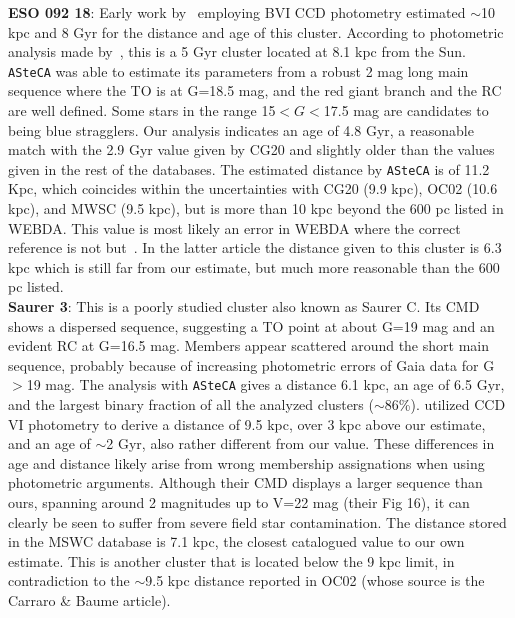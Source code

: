 \documentclass{aa}
\begin{document}
\begin{appendix}
  \noindent \textbf{ESO 092 18}: Early work by~\cite{Kubiak_1991} employing BVI CCD
  photometry estimated $\sim$10 kpc and 8 Gyr for the distance and age of this
  cluster.
  According to photometric analysis made by~\cite{Carraro1995}, this is a 5 Gyr
  cluster located at 8.1 kpc from the Sun.
  \texttt{ASteCA} was able to estimate its parameters from a robust 2 mag long
  main sequence where the TO is at G=18.5 mag, and the red giant branch and the
  RC are well defined. Some stars in the range 15$<G<$17.5 mag are candidates to
  being blue stragglers.
  Our analysis indicates an age of 4.8 Gyr, a reasonable match with the 2.9 Gyr
  value given by CG20 and slightly older than the values given in the rest of
  the databases. The estimated distance by \texttt{ASteCA} is of 11.2 Kpc, which
  coincides within the uncertainties with CG20 (9.9 kpc), OC02 (10.6 kpc), and
  MWSC (9.5 kpc), but is more than 10 kpc beyond the 600 pc listed in WEBDA.
  This value is most likely an error in WEBDA where the correct reference is
  not \cite{Phelps_1994_develop} but~\cite{Janes_1994}. In the latter article
  the distance given to this cluster is 6.3 kpc which is still far from our
  estimate, but much more reasonable than the 600 pc listed.\\

  \noindent \textbf{Saurer 3}: This is a poorly studied cluster also known as Saurer C.
  Its CMD shows a dispersed sequence, suggesting a TO point at about G=19 mag
  and an evident RC at G=16.5 mag. Members appear scattered around the short
  main sequence, probably because of increasing photometric errors of Gaia data
  for G$>$19 mag.
  The analysis with \texttt{ASteCA} gives a distance 6.1 kpc, an age of 6.5
  Gyr, and the largest binary fraction of all the analyzed clusters 
  ($\sim$86\%).
  \cite{Carraro_2003} utilized CCD VI photometry to derive a distance of 9.5
  kpc, over 3 kpc above our estimate, and an age of $\sim$2 Gyr, also rather
  different from our value. These differences in age and distance likely
  arise from wrong membership assignations when using photometric
  arguments. Although their CMD displays a larger sequence than
  ours, spanning around 2 magnitudes up to V=22 mag (their Fig 16), it can
  clearly be seen to suffer from severe field star contamination.
  The distance stored in the MSWC database is 7.1 kpc, the closest catalogued
  value to our own estimate. This is another cluster that is located below the 9
  kpc limit, in contradiction to the $\sim$9.5 kpc distance reported in
  OC02 (whose source is the Carraro \& Baume article).\\


\end{appendix}
\end{document}

